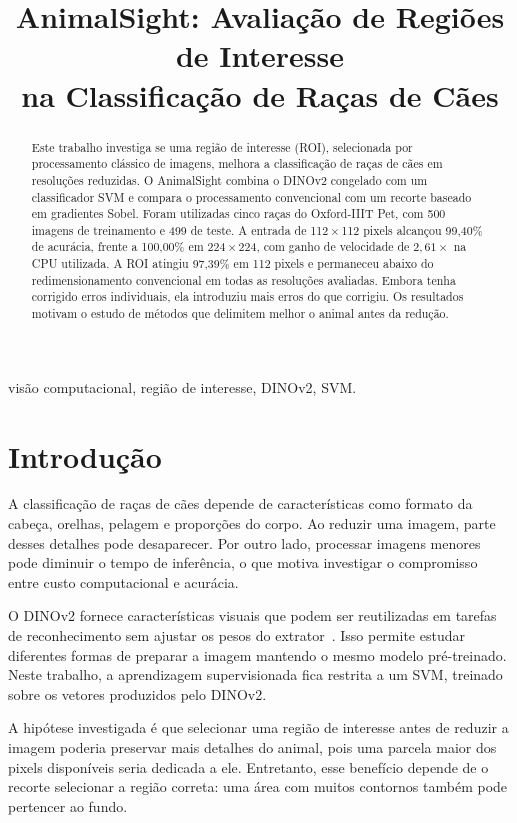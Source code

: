 \documentclass[conference]{IEEEtran}
\title{AnimalSight: Avaliação de Regiões de Interesse\\
na Classificação de Raças de Cães}
\author{
\IEEEauthorblockN{João Meyer Muhlmann}
\IEEEauthorblockA{Universidade Federal do Paraná\\
Trabalho Final de Visão Computacional\\
Novembro de 2026}
}
\begin{document}
\maketitle

\begin{abstract}
Este trabalho investiga se uma região de interesse (ROI), selecionada
por processamento clássico de imagens, melhora a classificação de
raças de cães em resoluções reduzidas. O AnimalSight combina o DINOv2
congelado com um classificador SVM e compara o processamento convencional
com um recorte baseado em gradientes Sobel. Foram utilizadas cinco raças
do Oxford-IIIT Pet, com 500 imagens de treinamento e 499 de teste.
A entrada de 112\,$\times$\,112 pixels alcançou 99,40\% de acurácia,
frente a 100,00\% em 224\,$\times$\,224, com ganho de velocidade de
$2{,}61\times$ na CPU utilizada. A ROI atingiu 97,39\% em 112 pixels
e permaneceu abaixo do redimensionamento convencional em todas as
resoluções avaliadas. Embora tenha corrigido erros individuais, ela
introduziu mais erros do que corrigiu. Os resultados motivam o estudo
de métodos que delimitem melhor o animal antes da redução.
\end{abstract}

\begin{IEEEkeywords}
visão computacional, região de interesse, DINOv2, SVM.
\end{IEEEkeywords}

\section{Introdução}
A classificação de raças de cães depende de características como
formato da cabeça, orelhas, pelagem e proporções do corpo. Ao reduzir
uma imagem, parte desses detalhes pode desaparecer. Por outro lado,
processar imagens menores pode diminuir o tempo de inferência, o que
motiva investigar o compromisso entre custo computacional e acurácia.

O DINOv2 fornece características visuais que podem ser reutilizadas
em tarefas de reconhecimento sem ajustar os pesos do extrator~\cite{dinov2}.
Isso permite estudar diferentes formas de preparar a imagem mantendo
o mesmo modelo pré-treinado. Neste trabalho, a aprendizagem supervisionada
fica restrita a um SVM, treinado sobre os vetores produzidos pelo DINOv2.

A hipótese investigada é que selecionar uma região de interesse antes
de reduzir a imagem poderia preservar mais detalhes do animal, pois
uma parcela maior dos pixels disponíveis seria dedicada a ele.
Entretanto, esse benefício depende de o recorte selecionar a região
correta: uma área com muitos contornos também pode pertencer ao fundo.
\end{document}

